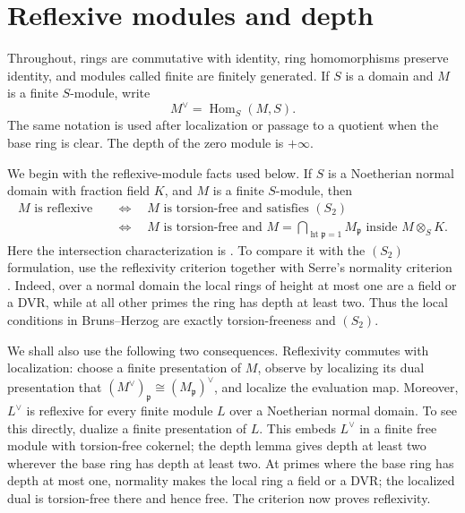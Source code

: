 \documentclass[reqno]{amsart}
\theoremstyle{plain}
\theoremstyle{definition}
\newcommand{\Hom}{\operatorname{Hom}}
\newcommand{\htp}{\operatorname{ht}}
\begin{document}
\section{Reflexive modules and depth}

Throughout, rings are commutative with identity, ring homomorphisms preserve
identity, and modules called finite are finitely generated.  If $S$ is a
domain and $M$ is a finite $S$-module, write
\[
  M^\vee=\Hom_S(M,S).
\]
The same notation is used after localization or passage to a quotient when
the base ring is clear.  The depth of the zero module is $+\infty$.

We begin with the reflexive-module facts used below.  If $S$ is a
Noetherian normal domain with fraction field $K$, and $M$ is a finite
$S$-module, then
\begin{equation}
\label{eq:reflexive-characterizations}
\begin{aligned}
  M\text{ is reflexive}
  &\quad\Longleftrightarrow\quad
  M\text{ is torsion-free and satisfies }(S_2)\\
  &\quad\Longleftrightarrow\quad
  M\text{ is torsion-free and }
  M=\bigcap_{\htp \mathfrak p=1}M_{\mathfrak p}
       \text{ inside }M\otimes_S K.
\end{aligned}
\end{equation}
Here the intersection characterization is
\cite[Proposition~1, pp.~238--239]{Samuel1964}.  To compare it with the $(S_2)$
formulation, use the reflexivity criterion
\cite[Proposition~1.4.1]{BrunsHerzog} together with Serre's normality
criterion \cite[Theorem~39, p.~125]{MatsumuraCA}.  Indeed, over a normal domain the
local rings of height at most one are a field or a DVR, while at all other
primes the ring has depth at least two.  Thus the local conditions in
Bruns--Herzog are exactly torsion-freeness and $(S_2)$.

We shall also use the following two consequences.  Reflexivity
commutes with localization: choose a finite presentation of $M$, observe by
localizing its dual presentation that
$(M^\vee)_{\mathfrak p}\cong(M_{\mathfrak p})^\vee$, and localize the
evaluation map.  Moreover, $L^\vee$ is reflexive for every finite module
$L$ over a Noetherian normal domain.  To see this directly, dualize a finite
presentation of $L$.  This embeds $L^\vee$ in a finite free module with
torsion-free cokernel; the depth lemma
\cite[Proposition~1.2.9]{BrunsHerzog} gives depth at least two wherever the
base ring has depth at least two.  At primes where the base ring has depth at
most one, normality makes the local ring a field or a DVR; the localized dual
is torsion-free there and hence free.  The criterion
\cite[Proposition~1.4.1]{BrunsHerzog} now proves reflexivity.
\end{document}
